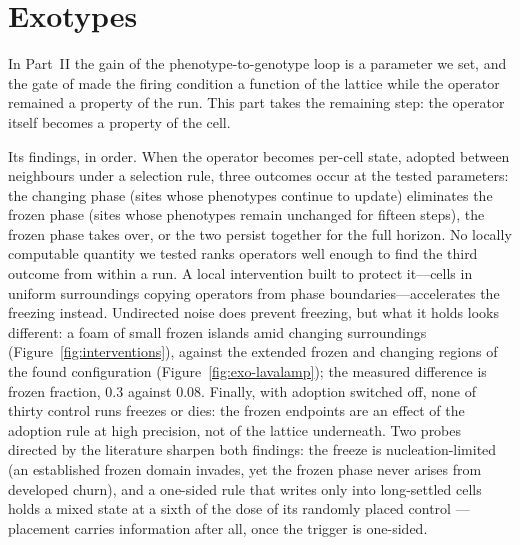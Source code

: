 %
%

\part{Exotypes}
\label{part:endogenous}

\noindent In Part~II the gain of the phenotype-to-genotype loop is a parameter
we set, and the gate of  made the firing
condition a function of the lattice while the operator remained a property of
the run. This part takes the remaining step: the operator itself becomes a
property of the cell.

Its findings, in order. When the operator becomes per-cell state, adopted
between neighbours under a selection rule, three outcomes occur at the tested
parameters: the changing phase (sites whose phenotypes continue to update) eliminates the frozen phase (sites whose phenotypes remain unchanged for fifteen steps), the frozen phase
takes over, or the two persist together for the full horizon. No locally
computable quantity we tested ranks operators well enough to find the third
outcome from within a run. A local intervention built to protect it---cells in
uniform surroundings copying operators from phase boundaries---accelerates
the freezing instead. Undirected noise does prevent freezing, but what it
holds looks different: a foam of small frozen islands amid changing
surroundings (Figure~\ref{fig:interventions}), against the extended frozen
and changing regions of the found configuration
(Figure~\ref{fig:exo-lavalamp}); the measured difference is frozen
fraction, $0.3$ against $0.08$. Finally, with adoption
switched off, none of thirty control runs freezes or dies: the frozen
endpoints are an effect of the adoption rule at high precision, not of the
lattice underneath. Two probes directed by the literature sharpen both
findings: the freeze is nucleation-limited (an established frozen domain
invades, yet the frozen phase never arises from developed churn), and a
one-sided rule that writes only into long-settled cells holds a mixed state
at a sixth of the dose of its randomly placed control --- placement carries
information after all, once the trigger is one-sided.

